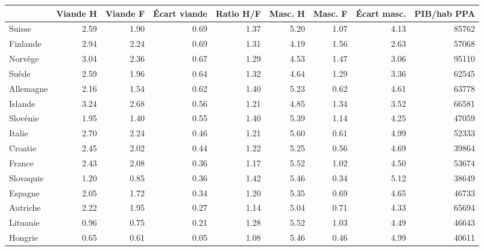 \begin{tabular}{lrrrrrrrr}
\toprule
 & Viande H & Viande F & Écart viande & Ratio H/F & Masc. H & Masc. F & Écart masc. & PIB/hab PPA \\
\midrule
Suisse & 2.59 & 1.90 & 0.69 & 1.37 & 5.20 & 1.07 & 4.13 & 85762 \\
Finlande & 2.94 & 2.24 & 0.69 & 1.31 & 4.19 & 1.56 & 2.63 & 57068 \\
Norvège & 3.04 & 2.36 & 0.67 & 1.29 & 4.53 & 1.47 & 3.06 & 95110 \\
Suède & 2.59 & 1.96 & 0.64 & 1.32 & 4.64 & 1.29 & 3.36 & 62545 \\
Allemagne & 2.16 & 1.54 & 0.62 & 1.40 & 5.23 & 0.62 & 4.61 & 63778 \\
Islande & 3.24 & 2.68 & 0.56 & 1.21 & 4.85 & 1.34 & 3.52 & 66581 \\
Slovénie & 1.95 & 1.40 & 0.55 & 1.40 & 5.39 & 1.14 & 4.25 & 47059 \\
Italie & 2.70 & 2.24 & 0.46 & 1.21 & 5.60 & 0.61 & 4.99 & 52333 \\
Croatie & 2.45 & 2.02 & 0.44 & 1.22 & 5.25 & 0.56 & 4.69 & 39864 \\
France & 2.43 & 2.08 & 0.36 & 1.17 & 5.52 & 1.02 & 4.50 & 53674 \\
Slovaquie & 1.20 & 0.85 & 0.36 & 1.42 & 5.46 & 0.34 & 5.12 & 38649 \\
Espagne & 2.05 & 1.72 & 0.34 & 1.20 & 5.35 & 0.69 & 4.65 & 46733 \\
Autriche & 2.22 & 1.95 & 0.27 & 1.14 & 5.04 & 0.71 & 4.33 & 65694 \\
Lituanie & 0.96 & 0.75 & 0.21 & 1.28 & 5.52 & 1.03 & 4.49 & 46643 \\
Hongrie & 0.65 & 0.61 & 0.05 & 1.08 & 5.46 & 0.46 & 4.99 & 40611 \\
\bottomrule
\end{tabular}
